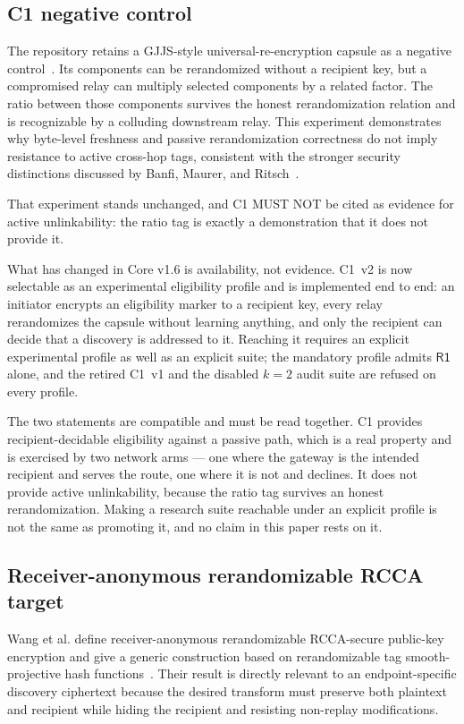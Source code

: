 \documentclass[11pt,oneside]{article}
\newcommand{\Rone}{\ensuremath{\mathsf{R1}}}
\begin{document}
\subsection{C1 negative control}

The repository retains a GJJS-style universal-re-encryption capsule as a negative control~\cite{gjjs}. Its components can be rerandomized without a recipient key, but a compromised relay can multiply selected components by a related factor. The ratio between those components survives the honest rerandomization relation and is recognizable by a colluding downstream relay. This experiment demonstrates why byte-level freshness and passive rerandomization correctness do not imply resistance to active cross-hop tags, consistent with the stronger security distinctions discussed by Banfi, Maurer, and Ritsch~\cite{ure2023}.

That experiment stands unchanged, and C1 MUST NOT be cited as evidence for active unlinkability: the ratio tag is exactly a demonstration that it does not provide it.

What has changed in Core v1.6 is availability, not evidence. C1~v2 is now selectable as an experimental eligibility profile and is implemented end to end: an initiator encrypts an eligibility marker to a recipient key, every relay rerandomizes the capsule without learning anything, and only the recipient can decide that a discovery is addressed to it. Reaching it requires an explicit experimental profile as well as an explicit suite; the mandatory profile admits \Rone{} alone, and the retired C1~v1 and the disabled $k{=}2$ audit suite are refused on every profile.

The two statements are compatible and must be read together. C1 provides recipient-decidable eligibility against a passive path, which is a real property and is exercised by two network arms --- one where the gateway is the intended recipient and serves the route, one where it is not and declines. It does not provide active unlinkability, because the ratio tag survives an honest rerandomization. Making a research suite reachable under an explicit profile is not the same as promoting it, and no claim in this paper rests on it.

\subsection{Receiver-anonymous rerandomizable RCCA target}

Wang et al. define receiver-anonymous rerandomizable RCCA-secure public-key encryption and give a generic construction based on rerandomizable tag smooth-projective hash functions~\cite{anonrcca2021}. Their result is directly relevant to an endpoint-specific discovery ciphertext because the desired transform must preserve both plaintext and recipient while hiding the recipient and resisting non-replay modifications.
\end{document}
